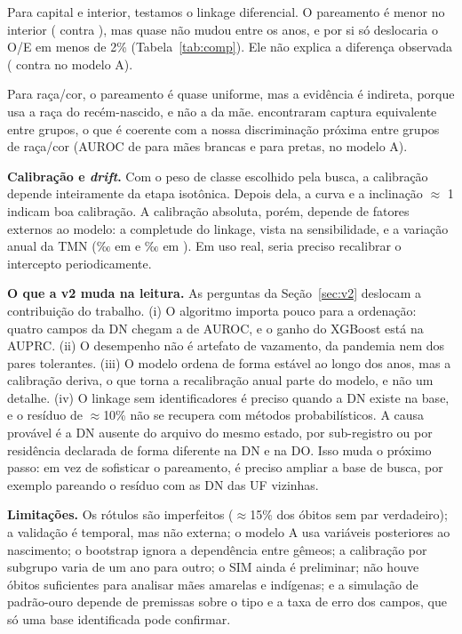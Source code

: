 \documentclass[12pt]{article}
\begin{document}
Para capital e interior, testamos o linkage diferencial. O pareamento é menor no interior (\linkInt{} contra \linkCap{}), mas quase não mudou entre os anos, e por si só deslocaria o O/E em menos de 2\% (Tabela~\ref{tab:comp}). Ele não explica a diferença observada (\oeRegACapCal{} contra \oeRegAIntCal{} no modelo A).

Para raça/cor, o pareamento é quase uniforme, mas a evidência é indireta, porque usa a raça do recém-nascido, e não a da mãe. \cite{ramos2025} encontraram captura equivalente entre grupos, o que é coerente com a nossa discriminação próxima entre grupos de raça/cor (AUROC de \subABrancaAuroc{} para mães brancas e \subAPretaAuroc{} para pretas, no modelo A).

\textbf{Calibração e \emph{drift}.} Com o peso de classe escolhido pela busca, a calibração depende inteiramente da etapa isotônica. Depois dela, a curva e a inclinação $\approx$ 1 indicam boa calibração. A calibração absoluta, porém, depende de fatores externos ao modelo: a completude do linkage, vista na sensibilidade, e a variação anual da TMN (\tmnValid{}‰ em \anoValid{} e \tmnTeste{}‰ em \anoTeste{}). Em uso real, seria preciso recalibrar o intercepto periodicamente.

\textbf{O que a v2 muda na leitura.} As perguntas da Seção~\ref{sec:v2} deslocam a contribuição do trabalho. (i) O algoritmo importa pouco para a ordenação: quatro campos da DN chegam a \vBaseQuatroAuroc{} de AUROC, e o ganho do XGBoost está na AUPRC. (ii) O desempenho não é artefato de vazamento, da pandemia nem dos pares tolerantes. (iii) O modelo ordena de forma estável ao longo dos anos, mas a calibração deriva, o que torna a recalibração anual parte do modelo, e não um detalhe. (iv) O linkage sem identificadores é preciso quando a DN existe na base, e o resíduo de $\approx$10\% não se recupera com métodos probabilísticos. A causa provável é a DN ausente do arquivo do mesmo estado, por sub-registro ou por residência declarada de forma diferente na DN e na DO. Isso muda o próximo passo: em vez de sofisticar o pareamento, é preciso ampliar a base de busca, por exemplo pareando o resíduo com as DN das UF vizinhas.

\textbf{Limitações.} Os rótulos são imperfeitos ($\approx$15\% dos óbitos sem par verdadeiro); a validação é temporal, mas não externa; o modelo A usa variáveis posteriores ao nascimento; o bootstrap ignora a dependência entre gêmeos; a calibração por subgrupo varia de um ano para outro; o SIM \anoObFim{} ainda é preliminar; não houve óbitos suficientes para analisar mães amarelas e indígenas; e a simulação de padrão-ouro depende de premissas sobre o tipo e a taxa de erro dos campos, que só uma base identificada pode confirmar.
\end{document}
